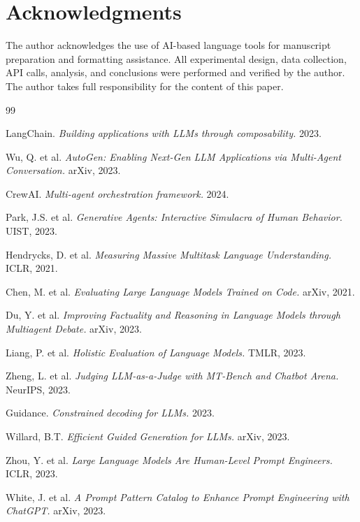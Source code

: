 \documentclass[11pt,a4paper]{article}
\begin{document}
\section*{Acknowledgments}

The author acknowledges the use of AI-based language tools for manuscript preparation and formatting assistance. All experimental design, data collection, API calls, analysis, and conclusions were performed and verified by the author. The author takes full responsibility for the content of this paper.


\begin{thebibliography}{99}

LangChain. \textit{Building applications with LLMs through composability.} 2023.

Wu, Q. et al. \textit{AutoGen: Enabling Next-Gen LLM Applications via Multi-Agent Conversation.} arXiv, 2023.

CrewAI. \textit{Multi-agent orchestration framework.} 2024.

Park, J.S. et al. \textit{Generative Agents: Interactive Simulacra of Human Behavior.} UIST, 2023.

Hendrycks, D. et al. \textit{Measuring Massive Multitask Language Understanding.} ICLR, 2021.

Chen, M. et al. \textit{Evaluating Large Language Models Trained on Code.} arXiv, 2021.

 Du, Y. et al. \textit{Improving Factuality and Reasoning in Language Models through Multiagent Debate.} arXiv, 2023.

Liang, P. et al. \textit{Holistic Evaluation of Language Models.} TMLR, 2023.

Zheng, L. et al. \textit{Judging LLM-as-a-Judge with MT-Bench and Chatbot Arena.} NeurIPS, 2023.

Guidance. \textit{Constrained decoding for LLMs.} 2023.

Willard, B.T. \textit{Efficient Guided Generation for LLMs.} arXiv, 2023.

Zhou, Y. et al. \textit{Large Language Models Are Human-Level Prompt Engineers.} ICLR, 2023.

White, J. et al. \textit{A Prompt Pattern Catalog to Enhance Prompt Engineering with ChatGPT.} arXiv, 2023.


\end{thebibliography}
\end{document}
